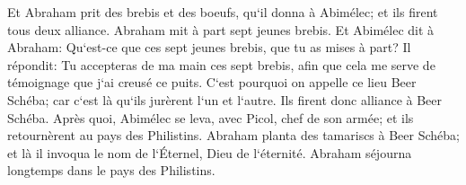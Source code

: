 \verse Et Abraham prit des brebis et des boeufs, qu`il donna à Abimélec; et ils firent tous deux alliance. 
\verse Abraham mit à part sept jeunes brebis. 
\verse Et Abimélec dit à Abraham: Qu`est-ce que ces sept jeunes brebis, que tu as mises à part? 
\verse Il répondit: Tu accepteras de ma main ces sept brebis, afin que cela me serve de témoignage que j`ai creusé ce puits. 
\verse C`est pourquoi on appelle ce lieu Beer Schéba; car c`est là qu`ils jurèrent l`un et l`autre. 
\verse Ils firent donc alliance à Beer Schéba. Après quoi, Abimélec se leva, avec Picol, chef de son armée; et ils retournèrent au pays des Philistins. 
\verse Abraham planta des tamariscs à Beer Schéba; et là il invoqua le nom de l`Éternel, Dieu de l`éternité. 
\verse Abraham séjourna longtemps dans le pays des Philistins. 

